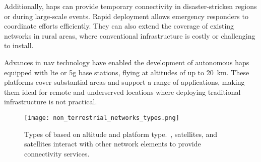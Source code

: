 Additionally, \glspl{hap} can provide temporary connectivity in disaster-stricken regions or during large-scale events. Rapid deployment allows emergency responders to coordinate efforts efficiently. They can also extend the coverage of existing networks in rural areas, where conventional infrastructure is costly or challenging to install.

Advances in \gls{uav} technology have enabled the development of autonomous \glspl{hap} equipped with \gls{lte} or \gls{5g} base stations, flying at altitudes of up to \SI{20}{\kilo\meter}. These platforms cover substantial areas and support a range of applications, making them ideal for remote and underserved locations where deploying traditional infrastructure is not practical.

\begin{figure}
  \texttt{[image: non\_terrestrial\_networks\_types.png]}
  \caption{Types of  based on altitude and platform type.\ ,  satellites, and  satellites interact with other network elements to provide connectivity services.\ \autocite{alertifyAirbusNTT}}\label{fig:ntn_types}
\end{figure}

